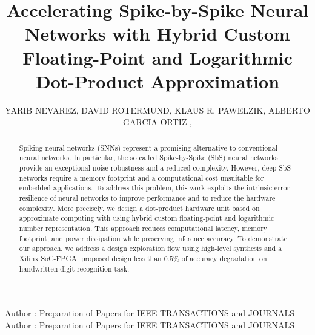 \title {Accelerating Spike-by-Spike Neural Networks  with Hybrid Custom Floating-Point and Logarithmic Dot-Product Approximation }

\author{
	\uppercase{Yarib Nevarez},	
	\uppercase{David Rotermund},
	\uppercase{Klaus R. Pawelzik},
	\uppercase{Alberto Garcia-Ortiz} ,
}

\address[1]{Institute of Electrodynamics and Microelectronics, University of Bremen, Bremen 28359, Germany (e-mail: nevarez@item.uni-bremen.de)}

\address[2]{Institute for Theoretical Physics, University of Bremen, Bremen 28359, Germany (e-mail: davrot@@neuro.uni-bremen.de)}

\address[3]{Institute for Theoretical Physics, University of Bremen, Bremen 28359, Germany (e-mail: pawelzik@@neuro.uni-bremen.de)}

\address[4]{Institute of Electrodynamics and Microelectronics, University of Bremen, Bremen 28359, Germany (e-mail: agaracia@item.uni-bremen.de)}


\markboth
{Author \headeretal: Preparation of Papers for IEEE TRANSACTIONS and JOURNALS}
{Author \headeretal: Preparation of Papers for IEEE TRANSACTIONS and JOURNALS}


\begin{abstract}
  Spiking neural networks (SNNs) represent a promising alternative to
  conventional neural networks. In particular, the so called
  Spike-by-Spike (SbS) neural networks provide an exceptional noise
  robustness and a reduced complexity. However, deep SbS networks
  require a memory footprint and a computational cost unsuitable for
  embedded applications. To address this problem, this work exploits
  the intrinsic error-resilience of neural networks to improve
  performance and to reduce the hardware complexity. More precisely,
  we design a dot-product hardware unit based on approximate computing
  with 
  using hybrid custom floating-point and logarithmic number
  representation. This approach reduces computational latency, memory
  footprint, and power dissipation while preserving inference
  accuracy. To demonstrate our approach, we address a design
  exploration flow using high-level synthesis and a Xilinx SoC-FPGA.
   proposed design  less than
  $0.5\%$ of accuracy degradation on  handwritten digit
  recognition task.
	
\end{abstract}

